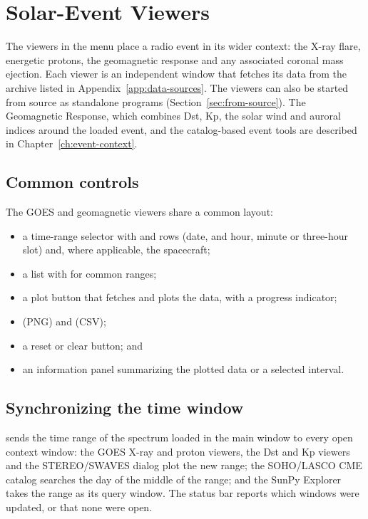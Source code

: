 \chapter{Solar-Event Viewers}
\label{ch:solar-events}

The viewers in the  menu place a radio event in its wider context: the
X-ray flare, energetic protons, the geomagnetic response and any associated coronal mass
ejection. Each viewer is an independent window that fetches its data from the archive
listed in Appendix~\ref{app:data-sources}. The viewers can also be started from source as
standalone programs (Section~\ref{sec:from-source}). The Geomagnetic Response, which combines
Dst, Kp, the solar wind and auroral indices around the loaded event, and the catalog-based
event tools are described in Chapter~\ref{ch:event-context}.

\section{Common controls}

The GOES and geomagnetic viewers share a common layout:
\begin{itemize}
  \item a time-range selector with  and  rows (date, and hour, minute or
    three-hour slot) and, where applicable, the spacecraft;
  \item a  list with  for common ranges;
  \item a plot button that fetches and plots the data, with a progress indicator;
  \item {} (PNG) and  (CSV);
  \item a reset or clear button; and
  \item an information panel summarizing the plotted data or a selected interval.
\end{itemize}

\section{Synchronizing the time window}
\label{sec:sync-time}

 sends the time range of the spectrum loaded in
the main window to every open context window: the GOES X-ray and proton viewers, the Dst and
Kp viewers and the STEREO/SWAVES dialog plot the new range; the SOHO/LASCO CME catalog
searches the day of the middle of the range; and the SunPy Explorer takes the range as its
query window. The status bar reports which windows were updated, or that none were open.

